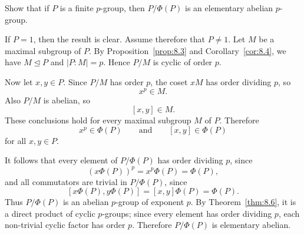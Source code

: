 \documentclass[../Odyssey_Project.tex]{subfiles}
\begin{document}
\begin{exercise}
\label{ex:8.10}
Show that if $P$ is a finite $p$-group, then $P/\Phi(P)$ is an elementary abelian $p$-group.
\end{exercise}
\begin{solution}
If $P=1$, then the result is clear. Assume therefore that $P\neq 1$. Let $M$ be a maximal subgroup of $P$. By Proposition~\ref{prop:8.3} and Corollary~\ref{cor:8.4}, we have $M\trianglelefteq P$ and $\lvert P:M\rvert=p$. Hence $P/M$ is cyclic of order $p$.

Now let $x,y\in P$. Since $P/M$ has order $p$, the coset $xM$ has order dividing $p$, so
\[
    x^p\in M.
\]
Also $P/M$ is abelian, so
\[
    [x,y]\in M.
\]
These conclusions hold for every maximal subgroup $M$ of $P$. Therefore
\[
    x^p\in\Phi(P)
    \qquad\text{and}\qquad
    [x,y]\in\Phi(P)
\]
for all $x,y\in P$.

It follows that every element of $P/\Phi(P)$ has order dividing $p$, since
\[
    (x\Phi(P))^p=x^p\Phi(P)=\Phi(P),
\]
and all commutators are trivial in $P/\Phi(P)$, since
\[
    [x\Phi(P),y\Phi(P)]=[x,y]\Phi(P)=\Phi(P).
\]
Thus $P/\Phi(P)$ is an abelian $p$-group of exponent $p$. By Theorem~\ref{thm:8.6}, it is a direct product of cyclic $p$-groups; since every element has order dividing $p$, each non-trivial cyclic factor has order $p$. Therefore $P/\Phi(P)$ is elementary abelian.
\end{solution}
\end{document}
